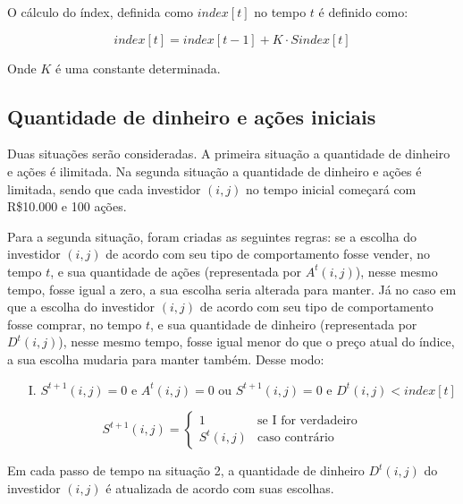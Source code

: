 \documentclass[brazil,ruledheader]{abnt}
\begin{document}
O cálculo do índex, definida como $index[t]$ no tempo $t$ é definido como:

\begin{equation}
index[t]=index[t-1]+K\cdot Sindex[t]
\end{equation}

Onde $K$ é uma constante determinada.



\subsection{Quantidade de dinheiro e ações iniciais}

Duas situações serão consideradas. A primeira situação a quantidade de dinheiro
e ações é ilimitada. Na segunda situação a quantidade de dinheiro e ações
é limitada, sendo que cada investidor $(i,j)$ no tempo inicial começará com
R\$10.000 e 100 ações.

Para a segunda situação, foram criadas as seguintes regras: se a escolha
do investidor $(i,j)$ de acordo com seu tipo de comportamento fosse vender, no
tempo $t$, e sua quantidade de ações (representada por $A^t(i,j)$), nesse mesmo
tempo, fosse igual a zero, a sua escolha seria alterada para manter. Já no caso
em que a escolha do investidor $(i,j)$ de acordo com seu tipo de
comportamento fosse comprar, no tempo $t$, e sua quantidade de
dinheiro (representada por $D^t(i,j)$), nesse mesmo tempo, fosse igual menor do
que o preço atual do índice, a sua escolha mudaria para manter também.
Desse modo:

\begin{enumerate}
 \item[I.] $S^{t+1}(i,j)=0$ e $A^t(i,j)=0$ ou $S^{t+1}(i,j)=0$ e
$D^t(i,j)<index[t]$
\end{enumerate}

\begin{equation}
S^{t+1}(i,j)=\left\{ \begin{array}{rl}
1 & \mbox{se I for verdadeiro}\\
S^t(i,j) &  \mbox{caso contrário}
\end{array}\right.
\end{equation}

Em cada passo de tempo na situação 2, a quantidade de dinheiro $D^t(i,j)$ do
investidor $(i,j)$ é atualizada de acordo com suas escolhas.
\end{document}
